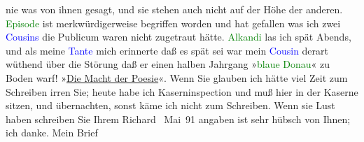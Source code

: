                nie was von ihnen gesagt, und sie stehen auch nicht auf der Höhe der anderen. \textcolor{green}{Episode}{}\ledrightnote{\textcolor{green}{Episode}} ist merkwürdigerweise begriffen worden und
               hat gefallen {\pb}was ich zwei \textcolor{blue}{Cousins}{} die Publicum
               waren nicht zugetraut hätte. \textcolor{green}{Alkandi}{}\ledrightnote{\textcolor{green}{Alkandi’s Lied}} las ich spät
               Abends, und als meine \textcolor{blue}{Tante}{}
               mich erinnerte daß es spät sei war mein \textcolor{blue}{Cousin}{} derart wüthend über die Störung daß er
               einen halben Jahrgang »\textcolor{green}{blaue Donau}{}\ledrightnote{\textcolor{green}{An der schönen blauen Donau}}« zu Boden warf!
                  »\uline{Die Macht der Poesie}«. Wenn Sie glauben ich hätte
               viel Zeit zum Schreiben irren Sie; heute habe ich Kaserninspection und muß hier in
               der Kaserne sitzen, und übernachten, sonst käme ich nicht zum Schreiben. Wenn sie
               Lust haben schreiben Sie Ihrem \spacefill\mbox{Richard}\pend
            Mai 91\pend
           \pstart
           \label{T_L00016_1v}\label{T_L00016_1h}{ }\label{K_L00016_2v}\label{K_L00016_2h} angaben ist sehr
                  hübsch von Ihnen; ich danke. Mein Brief \label{T_L00016_2v}\label{T_L00016_2h}\pend
           \endnumbering{}  
      